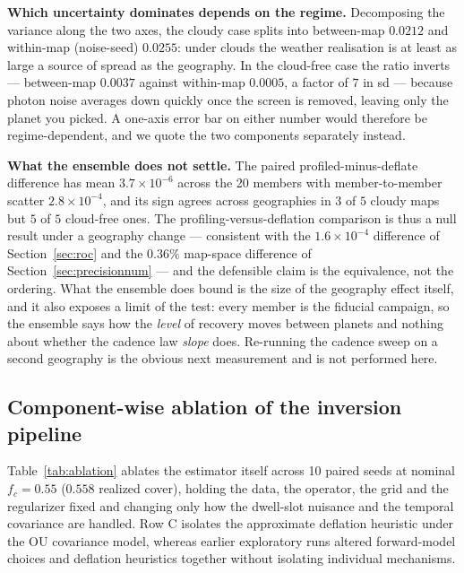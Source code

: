 \documentclass[twocolumn,10pt]{article}
\begin{document}
\textbf{Which uncertainty dominates depends on the regime.} Decomposing the
variance along the two axes, the cloudy case splits into between-map
$0.0212$ and within-map (noise-seed) $0.0255$: under clouds the weather
realisation is at least as large a source of spread as the geography. In the
cloud-free case the ratio inverts --- between-map $0.0037$ against within-map
$0.0005$, a factor of $7$ in sd --- because photon noise averages down quickly
once the screen is removed, leaving only the planet you picked. A one-axis
error bar on either number would therefore be regime-dependent, and we quote the
two components separately instead.

\textbf{What the ensemble does not settle.} The paired profiled-minus-deflate
difference has mean $3.7\times10^{-6}$ across the 20 members with
member-to-member scatter $2.8\times10^{-4}$, and its sign agrees across
geographies in $3$ of $5$ cloudy maps but $5$ of $5$ cloud-free ones. The
profiling-versus-deflation comparison is thus a null result under a geography
change --- consistent with the $1.6\times10^{-4}$ difference of
Section~\ref{sec:roc} and the $0.36\%$ map-space difference of
Section~\ref{sec:precisionnum} --- and the defensible claim is the equivalence, not
the ordering. What the ensemble does bound is the size of the geography effect
itself, and it also exposes a limit of the test: every member is the fiducial
campaign, so the ensemble says how the \emph{level} of recovery moves between
planets and nothing about whether the cadence law \emph{slope} does. Re-running
the cadence sweep on a second geography is the obvious next measurement and is
not performed here.

\subsection{Component-wise ablation of the inversion pipeline}
\label{sec:ablation}
Table~\ref{tab:ablation} ablates the estimator itself across 10 paired
seeds at nominal $f_c=0.55$ ($0.558$ realized cover), holding the data, the
operator, the grid and the regularizer fixed and changing only how the
dwell-slot nuisance and the temporal covariance are handled. Row C isolates the approximate deflation heuristic under the OU covariance model, whereas earlier exploratory runs altered forward-model choices and deflation heuristics together without isolating individual mechanisms.
\end{document}
